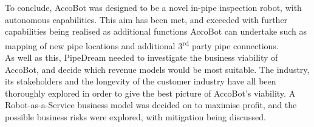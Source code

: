 \documentclass[11pt]{article}		%
\newcommand{\supercite}[1]{\textsuperscript{\cite{#1}}}		%
\begin{document}
        To conclude, AccoBot was designed to be a novel in-pipe inspection robot, with autonomous capabilities.
        This aim has been met, and exceeded with further capabilities being realised as additional functions AccoBot can undertake such as mapping of new pipe locations and additional 3\textsuperscript{rd} party pipe connections.
        \\ 
        \hspace*{3ex}As well as this, PipeDream needed to investigate the business viability of AccoBot, and decide which revenue models would be most suitable.
        The industry, its stakeholders and the longevity of the customer industry have all been thoroughly explored in order to give the best picture of AccoBot's viability.
        A Robot-as-a-Service business model was decided on to maximise profit, and the possible business risks were explored, with mitigation being discussed.

	\pagebreak		%
	
	
	
	
	\begin{multicols}{2}
		\begingroup\onehalfspacing
			{\tiny
				
				
			}
		\endgroup
	\end{multicols}
	
\end{document}
